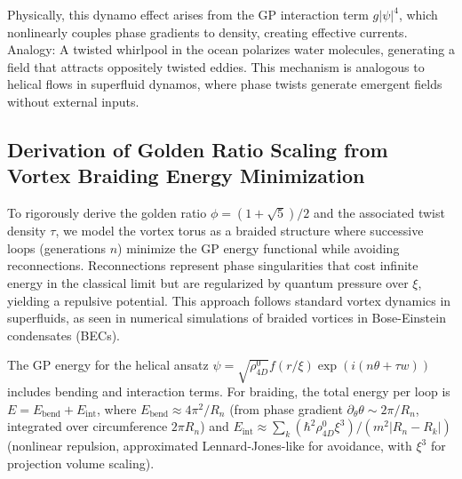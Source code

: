 Physically, this dynamo effect arises from the GP interaction term $g |\psi|^4$, which nonlinearly couples phase gradients to density, creating effective currents. Analogy: A twisted whirlpool in the ocean polarizes water molecules, generating a field that attracts oppositely twisted eddies. This mechanism is analogous to helical flows in superfluid dynamos, where phase twists generate emergent fields without external inputs.

\medskip
\noindent
{}
\medskip

\subsection{Derivation of Golden Ratio Scaling from Vortex Braiding Energy Minimization}

To rigorously derive the golden ratio $\phi = (1 + \sqrt{5})/2$ and the associated twist density $\tau$, we model the vortex torus as a braided structure where successive loops (generations $n$) minimize the GP energy functional while avoiding reconnections. Reconnections represent phase singularities that cost infinite energy in the classical limit but are regularized by quantum pressure over $\xi$, yielding a repulsive potential. This approach follows standard vortex dynamics in superfluids, as seen in numerical simulations of braided vortices in Bose-Einstein condensates (BECs).

The GP energy for the helical ansatz $\psi = \sqrt{\rho_{4D}^0} f(r/\xi) \exp(i (n \theta + \tau w))$ includes bending and interaction terms. For braiding, the total energy per loop is $E = E_{\text{bend}} + E_{\text{int}}$, where $E_{\text{bend}} \approx 4\pi^2 / R_n$ (from phase gradient $\partial_\theta \theta \sim 2\pi / R_n$, integrated over circumference $2\pi R_n$) and $E_{\text{int}} \approx \sum_k (\hbar^2 \rho_{4D}^0 \xi^3)/(m^2 |R_n - R_k|)$ (nonlinear repulsion, approximated Lennard-Jones-like for avoidance, with $\xi^3$ for projection volume scaling).

